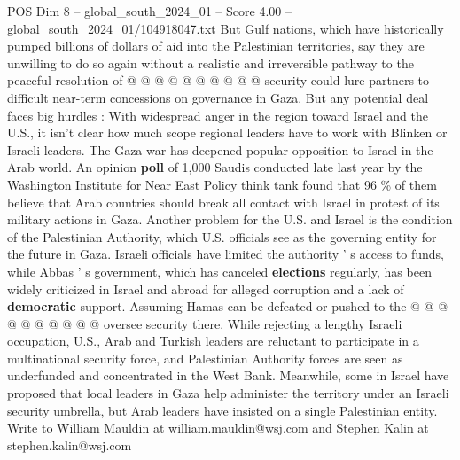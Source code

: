 \begin{textsample}{POS Dim 8 – global\_south\_2024\_01 – Score 4.00 – global\_south\_2024\_01/104918047.txt}
But Gulf nations, which have historically pumped billions of dollars of aid into the Palestinian territories, say they are unwilling to do so again without a realistic and irreversible pathway to the peaceful resolution of @ @ @ @ @ @ @ @ @ @ security could lure partners to difficult near-term concessions on governance in Gaza.
But any potential deal faces big hurdles : With widespread anger in the region toward Israel and the U.S., it isn't clear how much scope regional leaders have to work with Blinken or Israeli leaders.
The Gaza war has deepened popular opposition to Israel in the Arab world.
An opinion \textbf{poll} of 1,000 Saudis conducted late last year by the Washington Institute for Near East Policy think tank found that 96 \% of them believe that Arab countries should break all contact with Israel in protest of its military actions in Gaza.
Another problem for the U.S. and Israel is the condition of the Palestinian Authority, which U.S. officials see as the governing entity for the future in Gaza.
Israeli officials have limited the authority ' s access to funds, while Abbas ' s government, which has canceled \textbf{elections} regularly, has been widely criticized in Israel and abroad for alleged corruption and a lack of \textbf{democratic} support.
Assuming Hamas can be defeated or pushed to the @ @ @ @ @ @ @ @ @ @ oversee security there.
While rejecting a lengthy Israeli occupation, U.S., Arab and Turkish leaders are reluctant to participate in a multinational security force, and Palestinian Authority forces are seen as underfunded and concentrated in the West Bank.
Meanwhile, some in Israel have proposed that local leaders in Gaza help administer the territory under an Israeli security umbrella, but Arab leaders have insisted on a single Palestinian entity.
Write to William Mauldin at william.mauldin@wsj.com and Stephen Kalin at stephen.kalin@wsj.com

\end{textsample}
